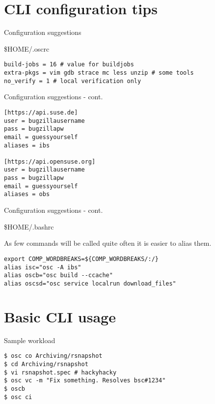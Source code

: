\documentclass{beamer}
\begin{document}
\section{CLI configuration tips}

\begin{frame}[fragile]{Configuration suggestions}
	\begin{center}\$HOME/.oscrc\end{center}
	\begin{small}
\begin{verbatim}
build-jobs = 16 # value for buildjobs
extra-pkgs = vim gdb strace mc less unzip # some tools
no_verify = 1 # local verification only
\end{verbatim}
	\end{small}
\end{frame}

\begin{frame}[fragile]{Configuration suggestions - cont.}
	\begin{small}
\begin{verbatim}
[https://api.suse.de]
user = bugzillausername
pass = bugzillapw
email = guessyourself
aliases = ibs

[https://api.opensuse.org]
user = bugzillausername
pass = bugzillapw
email = guessyourself
aliases = obs
\end{verbatim}
	\end{small}
\end{frame}

\begin{frame}[fragile]{Configuration suggestions - cont.}
	\begin{center}\$HOME/.bashrc\end{center}
	As few commands will be called quite often it is easier to alias them.
	\begin{small}
\begin{verbatim}
export COMP_WORDBREAKS=${COMP_WORDBREAKS/:/}
alias isc="osc -A ibs"
alias oscb="osc build --ccache"
alias oscsd="osc service localrun download_files"
\end{verbatim}
	\end{small}
\end{frame}

\section{Basic CLI usage}

\begin{frame}[fragile]{Sample workload}
	\begin{small}
\begin{verbatim}
$ osc co Archiving/rsnapshot
$ cd Archiving/rsnapshot
$ vi rsnapshot.spec # hackyhacky
$ osc vc -m "Fix something. Resolves bsc#1234"
$ oscb
$ osc ci
\end{verbatim}
	\end{small}
\end{frame}
\end{document}
